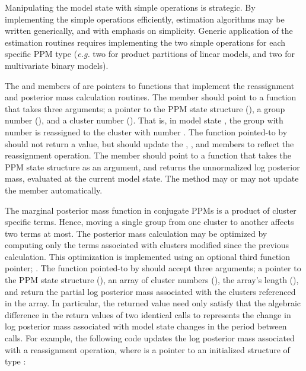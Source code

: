\documentclass[article, nojss]{jss}
\begin{document}
Manipulating the model state with simple operations is strategic. By implementing the simple operations efficiently, estimation algorithms may be written generically, and with emphasis on simplicity. Generic application of the estimation routines requires implementing the two simple operations for each specific PPM type ({\it e.g.} two for product partitions of linear models, and two for multivariate binary models).

The  and  members of  are pointers to  functions that implement the reassignment and posterior mass calculation routines. The  member should point to a function that takes three arguments; a pointer to the PPM state structure (), a group number (), and a cluster number (). That is, in model state , the group with number  is reassigned to the cluster with number . The function pointed-to by  should not return a value, but should update the , , and  members to reflect the reassignment operation. The  member should point to a function that takes the PPM state structure as an argument, and returns the unnormalized log posterior mass, evaluated at the current model state. The  method may or may not update the  member automatically.

The marginal posterior mass function in conjugate PPMs is a product of cluster specific terms. Hence, moving a single group from one cluster to another affects two terms at most. The posterior mass calculation may be optimized by computing only the terms associated with clusters modified since the previous calculation. This optimization is implemented using an optional third  function pointer; . The function pointed-to by  should accept three arguments; a pointer to the PPM state structure (), an array of cluster numbers (), the array's length (), and return the partial log posterior mass associated with the clusters referenced in the  array. In particular, the returned value need only satisfy that the algebraic difference in the return values of two identical calls to  represents the change in log posterior mass associated with model state changes in the period between calls. For example, the following  code updates the log posterior mass associated with a reassignment operation, where  is a pointer to an initialized structure of type :  
\end{document}
